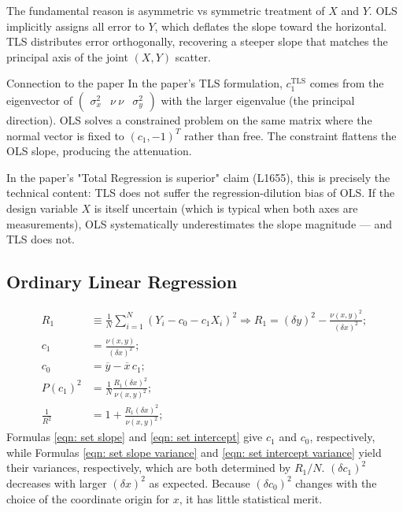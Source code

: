 \documentclass[twoside]{article}
\numberwithin{equation}{section}
\begin{document}
The fundamental reason is asymmetric vs symmetric treatment of $X$ and $Y$. OLS implicitly assigns all error to $Y$, which deflates the slope toward the horizontal. TLS distributes error orthogonally, recovering a steeper slope that matches the principal axis of the joint $(X, Y)$ scatter.

Connection to the paper
In the paper's TLS formulation, $c_1^{\text{TLS}}$ comes from the eigenvector of $\begin{pmatrix}\sigma_x^2 & \nu \ \nu & \sigma_y^2\end{pmatrix}$ with the larger eigenvalue (the principal direction). OLS solves a constrained problem on the same matrix where the normal vector is fixed to $(c_1, -1)^T$ rather than free. The constraint flattens the OLS slope, producing the attenuation.

In the paper's "Total Regression is superior" claim (L1655), this is precisely the technical content: TLS does not suffer the regression-dilution bias of OLS. If the design variable $X$ is itself uncertain (which is typical when both axes are measurements), OLS systematically underestimates the slope magnitude — and TLS does not.

\subsection{Ordinary Linear Regression}

\begin{align}
\label{eqn: set residual}
R_1 &\equiv \frac{1}{N} \sum_{i=1}^N (Y_i - c_0 - c_1 X_i)^2
		\Rightarrow R_1 = (\delta y)^2 - \frac{\nu(x, y)^2}{(\delta x)^2}; \\
\label{eqn: set slope}
c_1 &= \frac{\nu(x,y)}{(\delta x)^2}; \\
\label{eqn: set intercept}
c_0 &= \overline{y} - \overline{x}\, c_1; \\
\label{eqn: set slope precision}
P(c_1)^2 &= \frac{1}{N} \frac{R_1 (\delta x)^2}{\nu(x,y)^2}; \\
\label{eqn: set R2}
\frac{1}{R^2} &= 1 + \frac{R_1 (\delta x)^2}{\nu(x,y)^2};
\end{align}
Formulas \eqref{eqn: set slope} and \eqref{eqn: set intercept} give $c_1$ and $c_0$, respectively, while Formulas \eqref{eqn: set slope variance} and \eqref{eqn: set intercept variance} yield their variances, respectively, which are both determined by $R_1/N$.
$(\delta c_1)^2$ decreases with larger $(\delta x)^2$ as expected.
Because $(\delta c_0)^2$ changes with the choice of the coordinate origin for $x$, it has little statistical merit.
\end{document}
